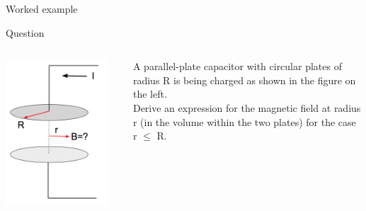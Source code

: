 %
%

{
\problemslide

%
%
%

\begin{frame}{Worked example }

\begin{blockexmplque}{Question}
\begin{columns}
  \begin{column}{0.22\textwidth}
   \begin{center}
     \includegraphics[width=0.90\textwidth]{./images/problems/lect6_capacitor.png}
   \end{center}
  \end{column}
  \begin{column}{0.78\textwidth}
     A parallel-plate capacitor with circular plates of radius R is being
     charged as shown in the figure on the left.\\
     Derive an expression for the magnetic field at radius r (in
     the volume within the two plates) for the case r $\leq$ R.
  \end{column}
\end{columns}
\end{blockexmplque}


\end{frame}}
